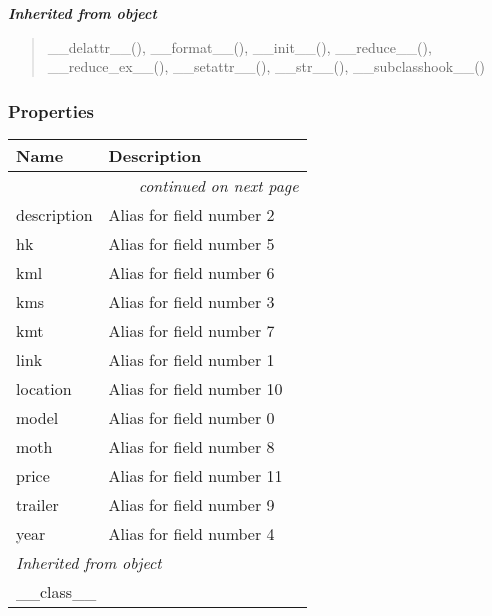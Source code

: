\large{\textbf{\textit{Inherited from object}}}

\begin{quote}
\_\_delattr\_\_(), \_\_format\_\_(), \_\_init\_\_(), \_\_reduce\_\_(), \_\_reduce\_ex\_\_(), \_\_setattr\_\_(), \_\_str\_\_(), \_\_subclasshook\_\_()
\end{quote}


  \subsubsection{Properties}

    \vspace{-1cm}
\hspace{\varindent}\begin{longtable}{|p{\varnamewidth}|p{\vardescrwidth}|l}
\cline{1-2}
\cline{1-2} \centering \textbf{Name} & \centering \textbf{Description}& \\
\cline{1-2}
\endhead\cline{1-2}\multicolumn{3}{r}{\small\textit{continued on next page}}\\\endfoot\cline{1-2}
\endlastfoot\raggedright d\-e\-s\-c\-r\-i\-p\-t\-i\-o\-n\- & \raggedright Alias for field number 2&\\
\cline{1-2}
\raggedright h\-k\- & \raggedright Alias for field number 5&\\
\cline{1-2}
\raggedright k\-m\-l\- & \raggedright Alias for field number 6&\\
\cline{1-2}
\raggedright k\-m\-s\- & \raggedright Alias for field number 3&\\
\cline{1-2}
\raggedright k\-m\-t\- & \raggedright Alias for field number 7&\\
\cline{1-2}
\raggedright l\-i\-n\-k\- & \raggedright Alias for field number 1&\\
\cline{1-2}
\raggedright l\-o\-c\-a\-t\-i\-o\-n\- & \raggedright Alias for field number 10&\\
\cline{1-2}
\raggedright m\-o\-d\-e\-l\- & \raggedright Alias for field number 0&\\
\cline{1-2}
\raggedright m\-o\-t\-h\- & \raggedright Alias for field number 8&\\
\cline{1-2}
\raggedright p\-r\-i\-c\-e\- & \raggedright Alias for field number 11&\\
\cline{1-2}
\raggedright t\-r\-a\-i\-l\-e\-r\- & \raggedright Alias for field number 9&\\
\cline{1-2}
\raggedright y\-e\-a\-r\- & \raggedright Alias for field number 4&\\
\cline{1-2}
\multicolumn{2}{|l|}{\textit{Inherited from object}}\\
\multicolumn{2}{|p{\varwidth}|}{\raggedright \_\_class\_\_}\\
\cline{1-2}
\end{longtable}

